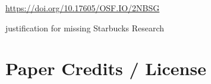 \documentclass[journal]{vgtc}                %
\begin{document}
\url{https://doi.org/10.17605/OSF.IO/2NBSG}

 justification for missing Starbucks Research



\section*{Paper Credits / License}








%

%
%
%


\end{document}
